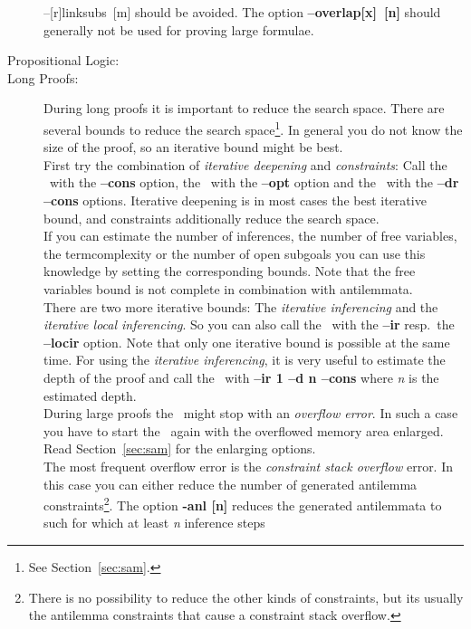 \begin{description}
{{      --[r]linksubs~[m]} should be avoided. The option {\bf
      --overlap[x]~[n]} should generally not be used for proving large
      formulae.} 
\item[Propositional Logic:]
     {}
\item[Long Proofs:]
     {During long proofs it is important to reduce the search space.
      There are several bounds to reduce the search space\footnote{See
      Section~\ref{sec:sam}.}. In general you do not know the size of
      the proof, so an iterative bound might be best.\\
      First try the combination of {\it iterative deepening\/} and
      {\it constraints\/}: Call the \inw\ with the {\bf --cons}
      option, the \wasm\ with the {\bf --opt} option and the \sam\
      with the {\bf --dr --cons} options. Iterative deepening
      is in most cases the best iterative bound, and 
      constraints additionally reduce the search space.\\
      If you can estimate the number of inferences, the number of free
      variables, the termcomplexity or the number of open subgoals you
      can use this knowledge by setting the corresponding bounds. Note
      that the free variables bound is not complete in combination
      with antilemmata.\\ 
      There are two more iterative bounds: The {\it iterative
      inferencing\/} and the {\it iterative local
      inferencing\/}. So you can also call the \SAM\
      with the {\bf --ir} resp.\ the {\bf --locir} option. Note that
      only one iterative bound is possible at the same time. For using
      the {\it iterative inferencing\/}, it is very useful to estimate
      the depth of the proof and call the \SAM\ with {\bf --ir 1 --d n 
      --cons} where {\it n\/} is the estimated depth.\\
      During large proofs the \sam\ might stop with an {\it overflow
      error\/}. In such a case you have to start the \SAM\ again with
      the overflowed memory area enlarged. Read Section~\ref{sec:sam}
      for the enlarging options.\\
      The most frequent overflow error is the {\it constraint
      stack overflow\/} error. In this case you can either reduce
      the number of 
      generated antilemma constraints\footnote{There is no possibility
      to reduce the other kinds of constraints, but its usually the
      antilemma constraints that cause a constraint stack
      overflow.}.
      The option {\bf -anl [n]} reduces the generated
      antilemmata to such for which at least {\it n\/} inference steps
}
\end{description}
